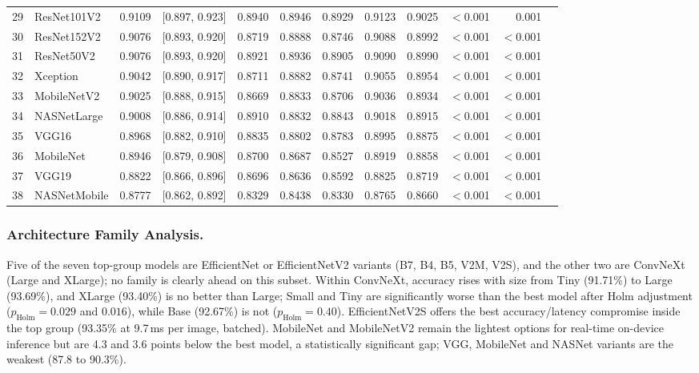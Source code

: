 \begin{table}[p]
{\begin{tabular}{rlccccccccrr}
29 & ResNet101V2 & 0.9109 & [0.897, 0.923] & 0.8940 & 0.8946 & 0.8929 & 0.9123 & 0.9025 & $<$0.001 & 0.001 \\
30 & ResNet152V2 & 0.9076 & [0.893, 0.920] & 0.8719 & 0.8888 & 0.8746 & 0.9088 & 0.8992 & $<$0.001 & $<$0.001 \\
31 & ResNet50V2 & 0.9076 & [0.893, 0.920] & 0.8921 & 0.8936 & 0.8905 & 0.9090 & 0.8990 & $<$0.001 & $<$0.001 \\
32 & Xception & 0.9042 & [0.890, 0.917] & 0.8711 & 0.8882 & 0.8741 & 0.9055 & 0.8954 & $<$0.001 & $<$0.001 \\
33 & MobileNetV2 & 0.9025 & [0.888, 0.915] & 0.8669 & 0.8833 & 0.8706 & 0.9036 & 0.8934 & $<$0.001 & $<$0.001 \\
34 & NASNetLarge & 0.9008 & [0.886, 0.914] & 0.8910 & 0.8832 & 0.8843 & 0.9018 & 0.8915 & $<$0.001 & $<$0.001 \\
35 & VGG16 & 0.8968 & [0.882, 0.910] & 0.8835 & 0.8802 & 0.8783 & 0.8995 & 0.8875 & $<$0.001 & $<$0.001 \\
36 & MobileNet & 0.8946 & [0.879, 0.908] & 0.8700 & 0.8687 & 0.8527 & 0.8919 & 0.8858 & $<$0.001 & $<$0.001 \\
37 & VGG19 & 0.8822 & [0.866, 0.896] & 0.8696 & 0.8636 & 0.8592 & 0.8825 & 0.8719 & $<$0.001 & $<$0.001 \\
38 & NASNetMobile & 0.8777 & [0.862, 0.892] & 0.8329 & 0.8438 & 0.8330 & 0.8765 & 0.8660 & $<$0.001 & $<$0.001 \\
\bottomrule
\end{tabular}}
\end{table}

\subsubsection{Architecture Family Analysis.}
Five of the seven top-group models are EfficientNet or EfficientNetV2 variants (B7, B4, B5, V2M, V2S), and the other two are ConvNeXt (Large and XLarge); no family is clearly ahead on this subset. Within ConvNeXt, accuracy rises with size from Tiny (91.71\%) to Large (93.69\%), and XLarge (93.40\%) is no better than Large; Small and Tiny are significantly worse than the best model after Holm adjustment ($p_{\mathrm{Holm}}=0.029$ and $0.016$), while Base (92.67\%) is not ($p_{\mathrm{Holm}}=0.40$). EfficientNetV2S offers the best accuracy/latency compromise inside the top group (93.35\% at 9.7\,ms per image, batched). MobileNet and MobileNetV2 remain the lightest options for real-time on-device inference but are 4.3 and 3.6 points below the best model, a statistically significant gap; VGG, MobileNet and NASNet variants are the weakest (87.8 to 90.3\%).

